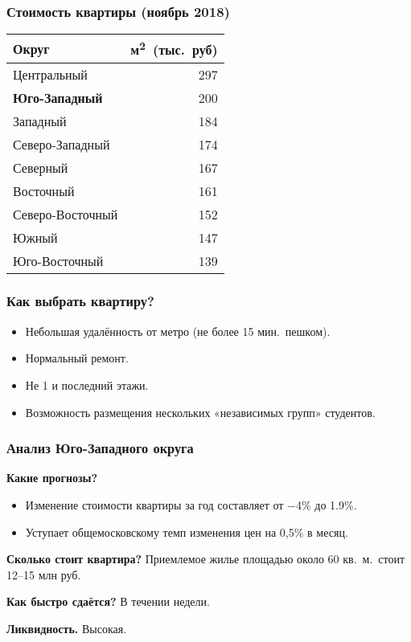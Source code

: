 \documentclass{beamer}
\begin{document}
		
		\begin{frame}
			\frametitle{Стоимость квартиры (ноябрь 2018)}
		
			
				\centering
				\begin{tabular}{ l r }
					\toprule
					Округ                 & м\textsuperscript{2}\ (тыс.\ руб) \\ \midrule
					Центральный           & 297                               \\
					\textbf{Юго-Западный} & 200                               \\
					Западный              & 184                               \\
					Северо-Западный       & 174                               \\
					Северный              & 167                               \\
					Восточный             & 161                               \\
					Северо-Восточный      & 152                               \\
					Южный                 & 147                               \\
					Юго-Восточный         & 139                               \\ \bottomrule
				\end{tabular}
			

		
		\end{frame}
		
		\begin{frame}
			\frametitle{Как выбрать квартиру?}
		
			\begin{itemize}
			\item Небольшая удалённость от метро (не более 15 мин.\ пешком).
			\item Нормальный ремонт.
			\item Не 1 и последний этажи.
			\item Возможность размещения нескольких «независимых групп» студентов.
			\end{itemize}
			
			
		\end{frame}
		
		\begin{frame}
			\frametitle{Анализ Юго-Западного округа}
		
			\textbf{Какие прогнозы?}
			\begin{itemize}
			\item Изменение стоимости квартиры за год составляет от $-$4\% до 1.9\%.
			\item Уступает общемосковскому темп изменения цен на 0,5\% в месяц.
			\end{itemize}
			
			\textbf{Сколько стоит квартира?} Приемлемое жилье площадью около 60 кв.\ м.\ стоит 12--15 млн руб.
			
			\textbf{Как быстро сдаётся?} В течении недели.
			
			\textbf{Ликвидность.} Высокая.
			
		\end{frame}
		
\end{document}
